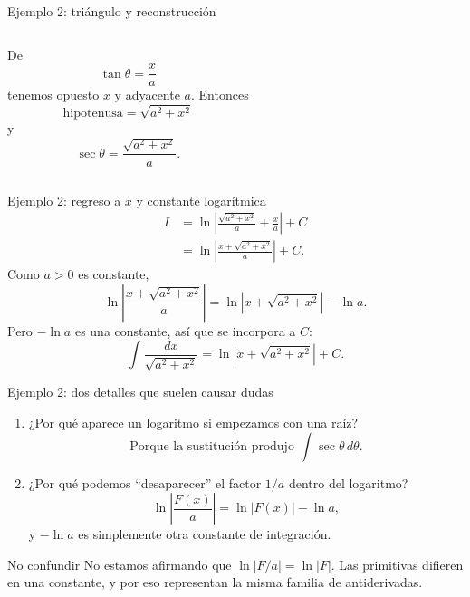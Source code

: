 \documentclass[10pt,aspectratio=169]{beamer}
\begin{document}
\begin{frame}{Ejemplo 2: triángulo y reconstrucción}
\begin{columns}[T]
De
\[
\tan\theta=\frac{x}{a}
\]
tenemos opuesto $x$ y adyacente $a$. Entonces
\[
\text{hipotenusa}=\sqrt{a^2+x^2}
\]
y
\[
\sec\theta=\frac{\sqrt{a^2+x^2}}{a}.
\]
\centering
{}
\end{columns}
\end{frame}

\begin{frame}{Ejemplo 2: regreso a $x$ y constante logarítmica}
\begin{align*}
I
&=\ln\left|
\frac{\sqrt{a^2+x^2}}{a}+\frac{x}{a}
\right|+C\\
&=\ln\left|\frac{x+\sqrt{a^2+x^2}}{a}\right|+C.
\end{align*}
Como $a>0$ es constante,
\[
\ln\left|\frac{x+\sqrt{a^2+x^2}}{a}\right|
=\ln|x+\sqrt{a^2+x^2}|-\ln a.
\]
Pero $-\ln a$ es una constante, así que se incorpora a $C$:
\[
\boxed{\int\frac{dx}{\sqrt{a^2+x^2}}
=\ln|x+\sqrt{a^2+x^2}|+C.}
\]
\end{frame}

\begin{frame}{Ejemplo 2: dos detalles que suelen causar dudas}
\begin{enumerate}
\item ¿Por qué aparece un logaritmo si empezamos con una raíz?
\[
\text{Porque la sustitución produjo }\int\sec\theta\,d\theta.
\]
\item ¿Por qué podemos ``desaparecer'' el factor $1/a$ dentro del logaritmo?
\[
\ln\left|\frac{F(x)}{a}\right|=\ln|F(x)|-\ln a,
\]
y $-\ln a$ es simplemente otra constante de integración.
\end{enumerate}
\begin{alertblock}{No confundir}
No estamos afirmando que $\ln|F/a|=\ln|F|$. Las primitivas difieren en una constante, y por eso representan la misma familia de antiderivadas.
\end{alertblock}
\end{frame}
\end{document}

